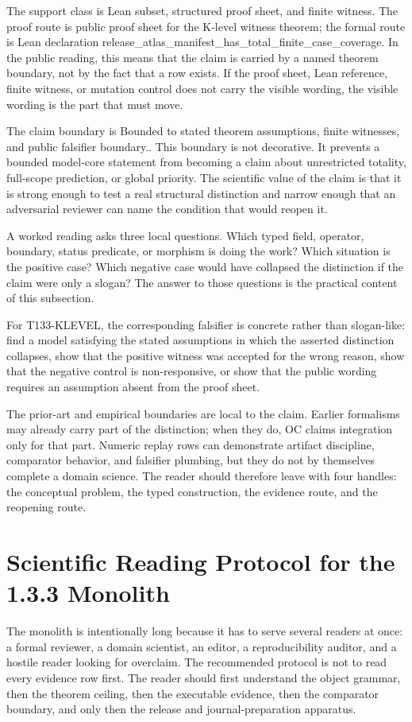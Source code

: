 The support class is Lean subset, structured proof sheet, and finite witness. The proof route is public proof sheet for the K-level witness theorem; the formal route is Lean declaration release\_atlas\_manifest\_has\_total\_finite\_case\_coverage. In the public reading, this means that the claim is carried by a named theorem boundary, not by the fact that a row exists. If the proof sheet, Lean reference, finite witness, or mutation control does not carry the visible wording, the visible wording is the part that must move.

The claim boundary is Bounded to stated theorem assumptions, finite witnesses, and public falsifier boundary.. This boundary is not decorative. It prevents a bounded model-core statement from becoming a claim about unrestricted totality, full-scope prediction, or global priority. The scientific value of the claim is that it is strong enough to test a real structural distinction and narrow enough that an adversarial reviewer can name the condition that would reopen it.

A worked reading asks three local questions. Which typed field, operator, boundary, status predicate, or morphism is doing the work? Which situation is the positive case? Which negative case would have collapsed the distinction if the claim were only a slogan? The answer to those questions is the practical content of this subsection.

For T133-KLEVEL, the corresponding falsifier is concrete rather than slogan-like: find a model satisfying the stated assumptions in which the asserted distinction collapses, show that the positive witness was accepted for the wrong reason, show that the negative control is non-responsive, or show that the public wording requires an assumption absent from the proof sheet.

The prior-art and empirical boundaries are local to the claim. Earlier formalisms may already carry part of the distinction; when they do, OC claims integration only for that part. Numeric replay rows can demonstrate artifact discipline, comparator behavior, and falsifier plumbing, but they do not by themselves complete a domain science. The reader should therefore leave with four handles: the conceptual problem, the typed construction, the evidence route, and the reopening route.


\section{Scientific Reading Protocol for the 1.3.3 Monolith}
\label{sec:oc133-scientific-reading-protocol}
The monolith is intentionally long because it has to serve several readers at once: a formal reviewer, a domain scientist, an editor, a reproducibility auditor, and a hostile reader looking for overclaim. The recommended protocol is not to read every evidence row first. The reader should first understand the object grammar, then the theorem ceiling, then the executable evidence, then the comparator boundary, and only then the release and journal-preparation apparatus.

